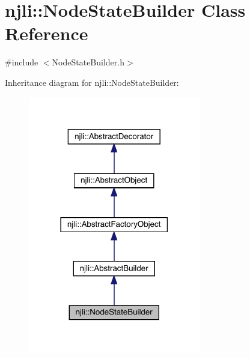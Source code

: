 \hypertarget{classnjli_1_1_node_state_builder}{}\section{njli\+:\+:Node\+State\+Builder Class Reference}
\label{classnjli_1_1_node_state_builder}


{\ttfamily \#include $<$Node\+State\+Builder.\+h$>$}



Inheritance diagram for njli\+:\+:Node\+State\+Builder\+:\nopagebreak
\begin{figure}[H]
\begin{center}
\leavevmode
\includegraphics[width=213pt]{classnjli_1_1_node_state_builder__inherit__graph}
\end{center}
\end{figure}


